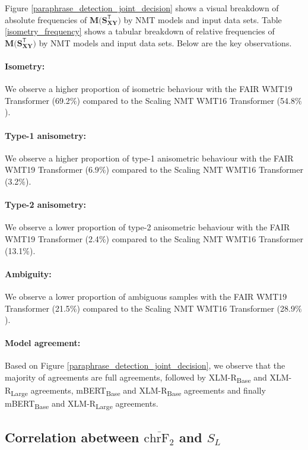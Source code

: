 \documentclass[11pt,a4paper]{article}
\begin{document}
Figure \ref{paraphrase_detection_joint_decision} shows a visual breakdown of absolute frequencies of $\mathbf{M(S_{XY}^{\mathsf{T}}})$ by NMT models and input data sets. Table \ref{isometry_frequency} shows a tabular breakdown of relative frequencies of $\mathbf{M(S_{XY}^{\mathsf{T}}})$ by NMT models and input data sets. Below are the key observations.

\paragraph{Isometry:} We observe a higher proportion of isometric behaviour with the FAIR WMT19 Transformer (69.2$\%$) compared to the Scaling NMT WMT16 Transformer (54.8$\%$).
\paragraph{Type-1 anisometry:} We observe a higher proportion of type-1 anisometric behaviour with the FAIR WMT19 Transformer (6.9$\%$) compared to the Scaling NMT WMT16 Transformer (3.2$\%$).
\paragraph{Type-2 anisometry:} We observe a lower proportion of type-2 anisometric behaviour with the FAIR WMT19 Transformer (2.4$\%$) compared to the Scaling NMT WMT16 Transformer (13.1$\%$).  
\paragraph{Ambiguity:} We observe a lower proportion of ambiguous samples with the FAIR WMT19 Transformer (21.5$\%$) compared to the Scaling NMT WMT16 Transformer (28.9$\%$).
\paragraph{Model agreement:} Based on Figure \ref{paraphrase_detection_joint_decision}, we observe that the majority of agreements are full agreements, followed by XLM-R\textsubscript{Base} and XLM-R\textsubscript{Large} agreements, mBERT\textsubscript{Base} and XLM-R\textsubscript{Base} agreements and finally mBERT\textsubscript{Base} and XLM-R\textsubscript{Large} agreements.

\subsection{Correlation abetween $\overline{\text{chrF}_2}$ and $S_L$}
\end{document}
